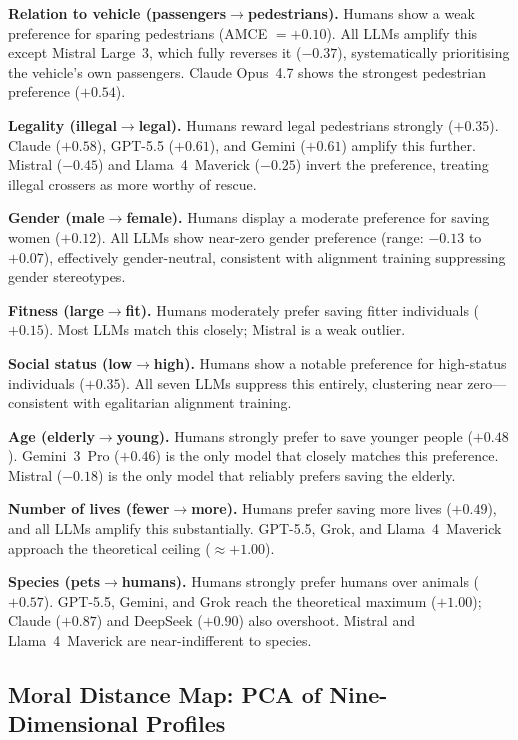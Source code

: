 \documentclass[11pt,letterpaper]{article}
\begin{document}
\textbf{Relation to vehicle (passengers$\to$pedestrians).} Humans show a weak
preference for sparing pedestrians (AMCE $= +0.10$). All LLMs amplify this except
Mistral Large~3, which fully reverses it ($-0.37$), systematically prioritising
the vehicle's own passengers. Claude Opus~4.7 shows the strongest pedestrian
preference ($+0.54$).

\textbf{Legality (illegal$\to$legal).} Humans reward legal pedestrians strongly
($+0.35$). Claude ($+0.58$), GPT-5.5 ($+0.61$), and Gemini ($+0.61$) amplify
this further. Mistral ($-0.45$) and Llama~4~Maverick ($-0.25$) invert the
preference, treating illegal crossers as more worthy of rescue.

\textbf{Gender (male$\to$female).} Humans display a moderate preference for
saving women ($+0.12$). All LLMs show near-zero gender preference (range:
$-0.13$ to $+0.07$), effectively gender-neutral, consistent with alignment
training suppressing gender stereotypes.

\textbf{Fitness (large$\to$fit).} Humans moderately prefer saving fitter
individuals ($+0.15$). Most LLMs match this closely; Mistral is a weak outlier.

\textbf{Social status (low$\to$high).} Humans show a notable preference for
high-status individuals ($+0.35$). All seven LLMs suppress this entirely,
clustering near zero---consistent with egalitarian alignment training.

\textbf{Age (elderly$\to$young).} Humans strongly prefer to save younger people
($+0.48$). Gemini~3~Pro ($+0.46$) is the only model that closely matches this
preference. Mistral ($-0.18$) is the only model that reliably prefers saving the
elderly.

\textbf{Number of lives (fewer$\to$more).} Humans prefer saving more lives
($+0.49$), and all LLMs amplify this substantially. GPT-5.5, Grok, and
Llama~4~Maverick approach the theoretical ceiling ($\approx +1.00$).

\textbf{Species (pets$\to$humans).} Humans strongly prefer humans over animals
($+0.57$). GPT-5.5, Gemini, and Grok reach the theoretical maximum ($+1.00$);
Claude ($+0.87$) and DeepSeek ($+0.90$) also overshoot. Mistral and Llama~4~Maverick
are near-indifferent to species.

\subsection{Moral Distance Map: PCA of Nine-Dimensional Profiles}
\end{document}
